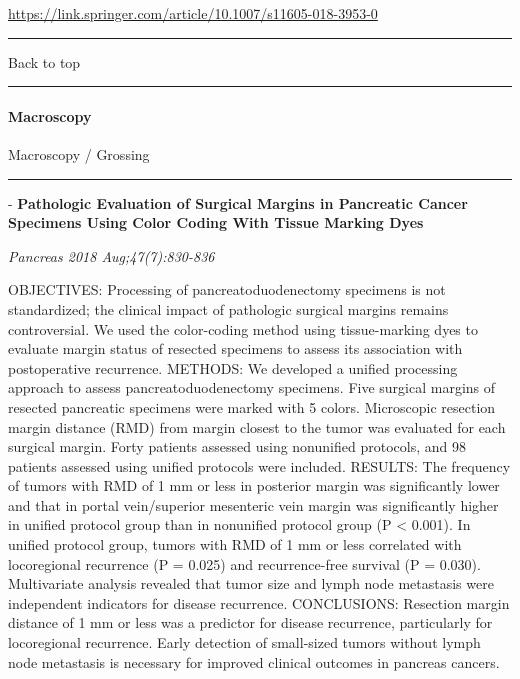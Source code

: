 \documentclass[]{article}
\let\oldparagraph\paragraph
\renewcommand{\paragraph}[1]{\oldparagraph{#1}\mbox{}}
\begin{document}
\url{https://link.springer.com/article/10.1007/s11605-018-3953-0}

\begin{center}\rule{0.5\linewidth}{\linethickness}\end{center}

Back to top

\begin{center}\rule{0.5\linewidth}{\linethickness}\end{center}

\pagebreak

\hypertarget{macroscopy}{%
\paragraph{Macroscopy}\label{macroscopy}}

Macroscopy / Grossing

\begin{center}\rule{0.5\linewidth}{\linethickness}\end{center}

 - \textbf{Pathologic Evaluation of Surgical Margins in Pancreatic
Cancer Specimens Using Color Coding With Tissue Marking Dyes}

\emph{Pancreas 2018 Aug;47(7):830-836}

OBJECTIVES: Processing of pancreatoduodenectomy specimens is not
standardized; the clinical impact of pathologic surgical margins remains
controversial. We used the color-coding method using tissue-marking dyes
to evaluate margin status of resected specimens to assess its
association with postoperative recurrence. METHODS: We developed a
unified processing approach to assess pancreatoduodenectomy specimens.
Five surgical margins of resected pancreatic specimens were marked with
5 colors. Microscopic resection margin distance (RMD) from margin
closest to the tumor was evaluated for each surgical margin. Forty
patients assessed using nonunified protocols, and 98 patients assessed
using unified protocols were included. RESULTS: The frequency of tumors
with RMD of 1 mm or less in posterior margin was significantly lower and
that in portal vein/superior mesenteric vein margin was significantly
higher in unified protocol group than in nonunified protocol group (P
\textless{} 0.001). In unified protocol group, tumors with RMD of 1 mm
or less correlated with locoregional recurrence (P = 0.025) and
recurrence-free survival (P = 0.030). Multivariate analysis revealed
that tumor size and lymph node metastasis were independent indicators
for disease recurrence. CONCLUSIONS: Resection margin distance of 1 mm
or less was a predictor for disease recurrence, particularly for
locoregional recurrence. Early detection of small-sized tumors without
lymph node metastasis is necessary for improved clinical outcomes in
pancreas cancers.
\end{document}
